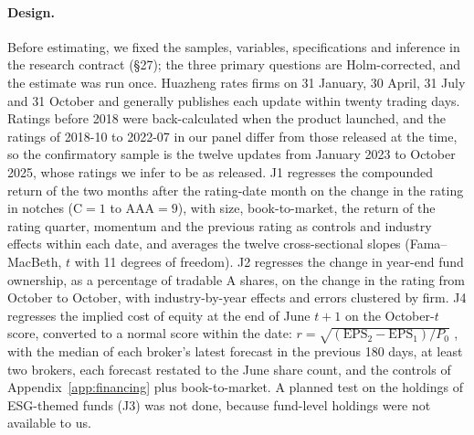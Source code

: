 \documentclass[11pt]{article}
\begin{document}
\paragraph{Design.} Before estimating, we fixed the samples, variables, specifications and inference in the research contract (\S27); the three primary questions are Holm-corrected, and the estimate was run once. Huazheng rates firms on 31 January, 30 April, 31 July and 31 October and generally publishes each update within twenty trading days. Ratings before 2018 were back-calculated when the product launched, and the ratings of 2018-10 to 2022-07 in our panel differ from those released at the time, so the confirmatory sample is the twelve updates from January 2023 to October 2025, whose ratings we infer to be as released. J1 regresses the compounded return of the two months after the rating-date month on the change in the rating in notches (C${}=1$ to AAA${}=9$), with size, book-to-market, the return of the rating quarter, momentum and the previous rating as controls and industry effects within each date, and averages the twelve cross-sectional slopes (Fama--MacBeth, $t$ with 11 degrees of freedom). J2 regresses the change in year-end fund ownership, as a percentage of tradable A shares, on the change in the rating from October to October, with industry-by-year effects and errors clustered by firm. J4 regresses the implied cost of equity at the end of June $t+1$ on the October-$t$ score, converted to a normal score within the date: $r = \sqrt{(\mathrm{EPS}_2 - \mathrm{EPS}_1)/P_0}$ \citep{easton2004pe}, with the median of each broker's latest forecast in the previous 180 days, at least two brokers, each forecast restated to the June share count, and the controls of Appendix~\ref{app:financing} plus book-to-market. A planned test on the holdings of ESG-themed funds (J3) was not done, because fund-level holdings were not available to us.
\end{document}
